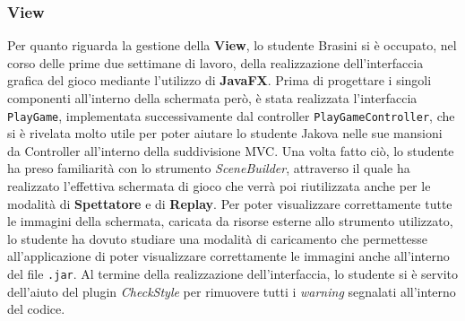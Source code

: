      \clearpage
     
     \subsubsection{View}\label{subsub:brasini:view}
     Per quanto riguarda la gestione della \textbf{View}, lo studente Brasini si è occupato, nel corso delle prime due settimane di lavoro, della realizzazione dell'interfaccia grafica del gioco mediante l'utilizzo di \textbf{JavaFX}. Prima di progettare i singoli componenti all'interno della schermata però, è stata realizzata l'interfaccia \texttt{PlayGame}, implementata successivamente dal controller \texttt{PlayGameController}, che si è rivelata molto utile per poter aiutare lo studente Jakova nelle sue mansioni da Controller all'interno della suddivisione MVC. Una volta fatto ciò, lo studente ha preso familiarità con lo strumento \textit{SceneBuilder}, attraverso il quale ha realizzato l'effettiva schermata di gioco che verrà poi riutilizzata anche per le modalità di \textbf{Spettatore} e di \textbf{Replay}. Per poter visualizzare correttamente tutte le immagini della schermata, caricata da risorse esterne allo strumento utilizzato, lo studente ha dovuto studiare una modalità di caricamento che permettesse all'applicazione di poter visualizzare correttamente le immagini anche all'interno del file \texttt{.jar}. Al termine della realizzazione dell'interfaccia, lo studente si è servito dell'aiuto del plugin \textit{CheckStyle} per rimuovere tutti i \textit{warning} segnalati all'interno del codice.

